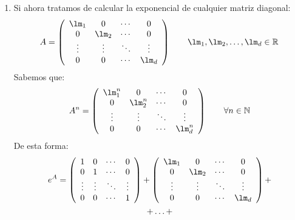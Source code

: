 \begin{ejemplo}
\begin{enumerate}
        \item Si ahora tratamos de calcular la exponencial de cualquier matriz diagonal:
            \begin{equation*}
                A = \left(\begin{array}{cccc}
                        \lm_1 & 0 & \cdots & 0 \\
                        0 & \lm_2 & \cdots & 0 \\
                        \vdots & \vdots & \ddots & \vdots \\
                        0 & 0 & \cdots & \lm_d
                \end{array}\right) \qquad \lm_1,\lm_2,\ldots,\lm_d\in \mathbb{R}
            \end{equation*}
            Sabemos que:
            \begin{equation*}
                A^n = \left(\begin{array}{cccc}
                        \lm_1^n & 0 & \cdots & 0 \\
                        0 & \lm_2^n & \cdots & 0 \\
                        \vdots & \vdots & \ddots & \vdots \\
                        0 & 0 & \cdots & \lm_d^n
                \end{array}\right)  \qquad \forall n\in \mathbb{N}
            \end{equation*}
            De esta forma:
            \begin{multline*}
                e^A = \left(\begin{array}{cccc}
                        1 & 0 & \cdots & 0 \\
                        0 & 1 & \cdots & 0 \\
                        \vdots & \vdots & \ddots & \vdots \\
                        0 & 0 & \cdots & 1
                \end{array}\right) + 
                \left(\begin{array}{cccc}
                     \lm_1 & 0 & \cdots & 0 \\
                     0 & \lm_2 & \cdots & 0 \\
                    \vdots & \vdots & \ddots & \vdots \\
                     0 & 0  & \cdots & \lm_d
                \end{array}\right) + \\ + \ldots +

\end{multline*}
\end{enumerate}
\end{ejemplo}
